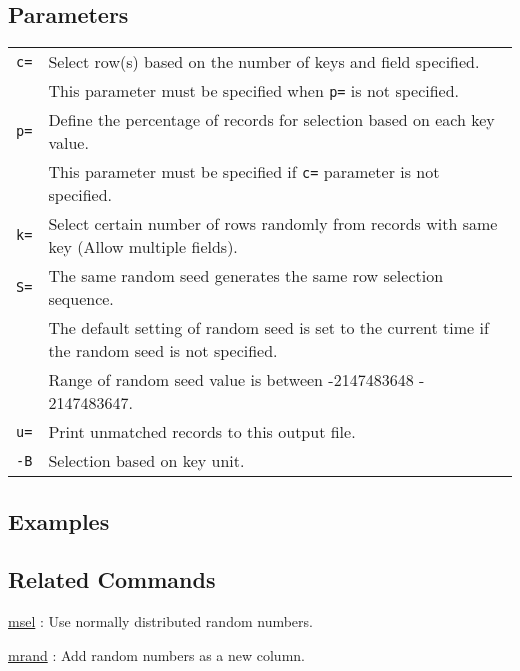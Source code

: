 \subsection*{Parameters}
\begin{table}[htbp]
{\small
\begin{tabular}{ll}
\verb|c=|    &  Select row(s) based on the number of keys and field specified. \\
             & This parameter must be specified when \verb|p=| is not specified. \\
\verb|p=|    & Define the percentage of records for selection based on each key value. \\
             & This parameter must be specified if \verb|c=| parameter is not specified.  \\
\verb|k=|    & Select certain number of rows randomly from records with same key  (Allow multiple fields). \\

\verb|S=|    & The same random seed generates the same row selection sequence. \\
             & The default setting of random seed is set to the current time if the random seed is not specified.  \\
             & Range of random seed value is between -2147483648 - 2147483647. \\
\verb|u=|    & Print unmatched records to this output file. \\
\verb|-B|    & Selection based on key unit.\\
\end{tabular} 
}
\end{table} 


\subsection*{Examples}


\subsection*{Related Commands}
\hyperref[sect:msel]{msel} :  Use normally distributed random numbers. 

\hyperref[sect:mrand]{mrand} : Add random numbers as a new column. 


%
